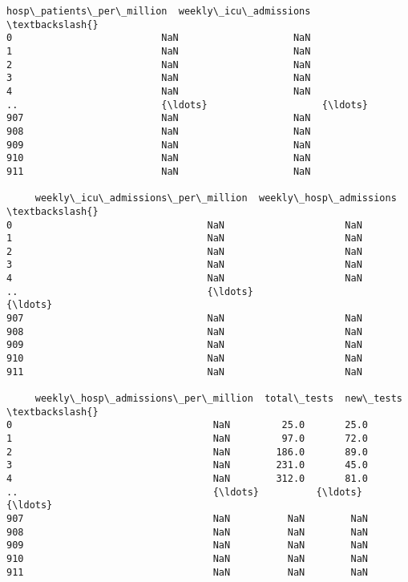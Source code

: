 \documentclass[11pt]{article}
\begin{document}
\begin{tcolorbox}[breakable, size=fbox, boxrule=.5pt, pad at break*=1mm, opacityfill=0]
\begin{Verbatim}[commandchars=\\\{\}]
     hosp\_patients\_per\_million  weekly\_icu\_admissions  \textbackslash{}
0                          NaN                    NaN
1                          NaN                    NaN
2                          NaN                    NaN
3                          NaN                    NaN
4                          NaN                    NaN
..                         {\ldots}                    {\ldots}
907                        NaN                    NaN
908                        NaN                    NaN
909                        NaN                    NaN
910                        NaN                    NaN
911                        NaN                    NaN

     weekly\_icu\_admissions\_per\_million  weekly\_hosp\_admissions  \textbackslash{}
0                                  NaN                     NaN
1                                  NaN                     NaN
2                                  NaN                     NaN
3                                  NaN                     NaN
4                                  NaN                     NaN
..                                 {\ldots}                     {\ldots}
907                                NaN                     NaN
908                                NaN                     NaN
909                                NaN                     NaN
910                                NaN                     NaN
911                                NaN                     NaN

     weekly\_hosp\_admissions\_per\_million  total\_tests  new\_tests  \textbackslash{}
0                                   NaN         25.0       25.0
1                                   NaN         97.0       72.0
2                                   NaN        186.0       89.0
3                                   NaN        231.0       45.0
4                                   NaN        312.0       81.0
..                                  {\ldots}          {\ldots}        {\ldots}
907                                 NaN          NaN        NaN
908                                 NaN          NaN        NaN
909                                 NaN          NaN        NaN
910                                 NaN          NaN        NaN
911                                 NaN          NaN        NaN


\end{Verbatim}
\end{tcolorbox}
\end{document}
